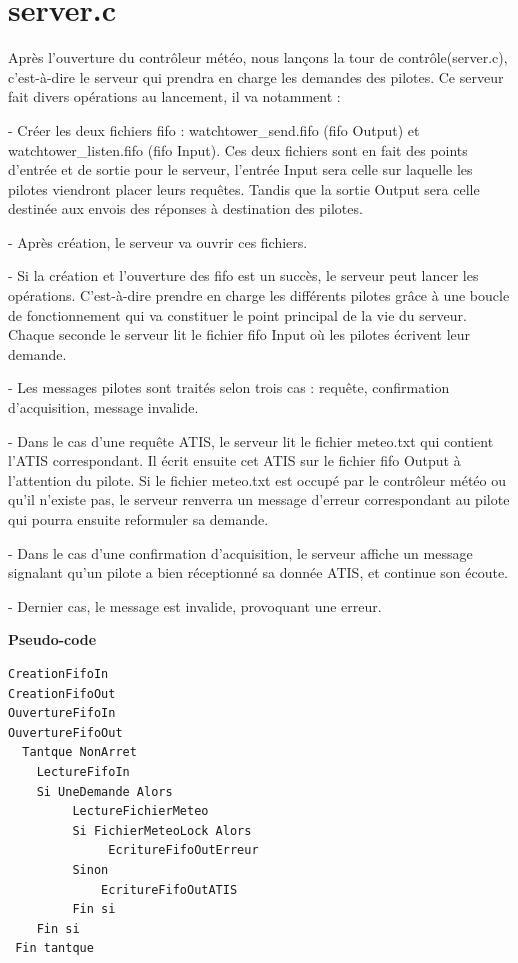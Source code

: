 \documentclass{report}
\begin{document}
{	\section{server.c}

		Après l'ouverture du contrôleur météo, nous lançons la tour de contrôle(server.c), c'est-à-dire le serveur qui prendra en charge les demandes des pilotes.
		Ce serveur fait divers opérations au lancement, il va notamment : 

		- Créer les deux fichiers fifo : watchtower\_send.fifo (fifo Output) et watchtower\_listen.fifo (fifo Input).
		Ces deux fichiers sont en fait des points d'entrée et de sortie pour le serveur, l'entrée Input sera celle sur laquelle les pilotes viendront placer leurs requêtes.
		Tandis que la sortie Output sera celle destinée aux envois des réponses à destination des pilotes.

		- Après création, le serveur va ouvrir ces fichiers.

		- Si la création et l'ouverture des fifo est un succès, le serveur peut lancer les opérations. C'est-à-dire prendre en charge les différents pilotes grâce à une boucle de fonctionnement qui va constituer le point principal de la vie du serveur.
		Chaque seconde le serveur lit le fichier fifo Input où les pilotes écrivent leur demande.

		- Les messages pilotes sont traités selon trois cas : requête, confirmation d'acquisition, message invalide.

		- Dans le cas d'une requête ATIS, le serveur lit le fichier meteo.txt qui contient l'ATIS correspondant. Il écrit ensuite cet ATIS sur le fichier fifo Output à l'attention du pilote. 
		Si le fichier meteo.txt est occupé par le contrôleur météo ou qu'il n'existe pas, le serveur renverra un message d'erreur correspondant au pilote qui pourra ensuite reformuler sa demande.

		- Dans le cas d'une confirmation d’acquisition, le serveur affiche un message signalant qu'un pilote a bien réceptionné sa donnée ATIS, et continue son écoute.

		- Dernier cas, le message est invalide, provoquant une erreur.
  \newline
	
 \textbf{Pseudo-code}

 \begin{lstlisting}[language=C]
CreationFifoIn
CreationFifoOut
OuvertureFifoIn
OuvertureFifoOut
  Tantque NonArret
	LectureFifoIn
	Si UneDemande Alors 
		 LectureFichierMeteo
		 Si FichierMeteoLock Alors
		 	  EcritureFifoOutErreur
		 Sinon
			 EcritureFifoOutATIS
		 Fin si
	Fin si
 Fin tantque 
  \end{lstlisting}

}
\end{document}
